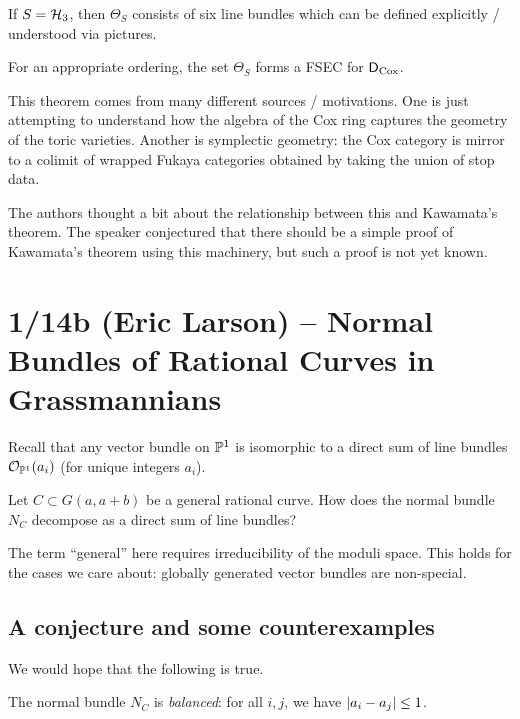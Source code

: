 \documentclass{article}
\begin{document}
\begin{ex}
	If $S = \mathcal{H}_3$, then $\Theta_S$ consists of six line bundles which can be defined explicitly / understood via pictures.
\end{ex}

\begin{thm}
	For an appropriate ordering, the set $\Theta_S$ forms a FSEC for $\mathsf{D}_{\operatorname{Cox}}$.
\end{thm}

This theorem comes from many different sources / motivations.
One is just attempting to understand how the algebra of the Cox ring captures the geometry of the toric varieties.
Another is symplectic geometry: the Cox category is mirror to a colimit of wrapped Fukaya categories obtained by taking the union of stop data.

The authors thought a bit about the relationship between this and Kawamata's theorem.
The speaker conjectured that there should be a simple proof of Kawamata's theorem using this machinery, but such a proof is not yet known.

\section{1/14b (Eric Larson) -- Normal Bundles of Rational Curves in Grassmannians}

Recall that any vector bundle on $\mathbb{P}^1$ is isomorphic to a direct sum of line bundles $\mathcal{O}_{\mathbb{P}^1}(a_i)$ (for unique integers $a_i$).

\begin{qn}
	Let $C \subset G(a, a + b)$ be a general rational curve.
	How does the normal bundle $N_C$ decompose as a direct sum of line bundles?
\end{qn}

The term ``general'' here requires irreducibility of the moduli space.
This holds for the cases we care about: globally generated vector bundles are non-special.

\subsection{A conjecture and some counterexamples}

We would hope that the following is true.

\begin{conj}
	The normal bundle $N_C$ is \emph{balanced}: for all $i, j$, we have $\left|{a_i - a_j}\right| \leq 1$.
\end{conj}
\end{document}
